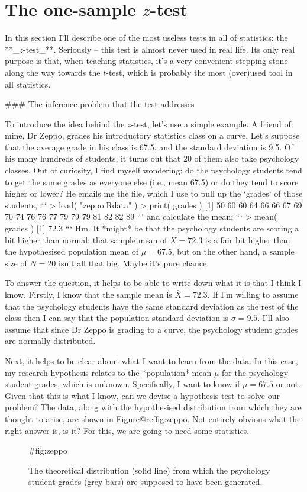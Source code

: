 \section{The one-sample $z$-test}

In this section I'll describe one of the most useless tests in all of statistics: the **_$z$-test_**. Seriously -- this test is almost never used in real life. Its only real purpose is that, when teaching statistics, it's a very convenient stepping stone along the way towards the $t$-test, which is probably the most (over)used tool in all statistics.

### The inference problem that the test addresses

To introduce the idea behind the $z$-test, let's use a simple example. A friend of mine, Dr Zeppo, grades his introductory statistics class on a curve. Let's suppose that the average grade in his class is 67.5, and the standard deviation is 9.5. Of his many hundreds of students, it turns out that 20 of them also take psychology classes. Out of curiosity, I find myself wondering: do the psychology students tend to get the same grades as everyone else (i.e., mean 67.5) or do they tend to score higher or lower? He emails me the  file, which I use to pull up the `grades` of those students, 
```
> load( "zeppo.Rdata" ) 
> print( grades )
 [1] 50 60 60 64 66 66 67 69 70 74 76 76 77 79 79 79 81 82 82 89
``` 
and calculate the mean:
```
> mean( grades )
[1] 72.3
```
Hm. It *might* be that the psychology students are scoring a bit higher than normal: that sample mean of $\bar{X} = 72.3$ is a fair bit higher than the hypothesised population mean of $\mu = 67.5$, but on the other hand, a sample size of $N = 20$ isn't all that big. Maybe it's pure chance. 

To answer the question, it helps to be able to write down what it is that I think I know. Firstly, I know that the sample mean is $\bar{X} = 72.3$. If I'm willing to assume that the psychology students have the same standard deviation as the rest of the class then I can say that the population standard deviation is $\sigma = 9.5$. I'll also assume that since Dr Zeppo is grading to a curve, the psychology student grades are normally distributed. 

Next, it helps to be clear about what I want to learn from the data. In this case, my research hypothesis relates to the *population* mean $\mu$ for the psychology student grades, which is unknown. Specifically, I want to know if $\mu = 67.5$ or not. Given that this is what I know, can we devise a hypothesis test to solve our problem? The data, along with the hypothesised distribution from which they are thought to arise, are shown in Figure@reffig:zeppo. Not entirely obvious what the right answer is, is it? For this, we are going to need some statistics.
\begin{figure}
\begin{center}
\caption{The theoretical distribution (solid line) from which the psychology student grades (grey bars) are supposed to have been generated.}
\HR
{#fig:zeppo}
\end{center}
\end{figure}


